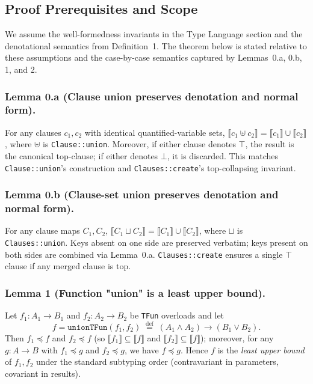 \documentclass[11pt]{article}
\begin{document}
\subsection*{Proof Prerequisites and Scope}
We assume the well-formedness invariants in the Type Language section and the denotational semantics from Definition~1. The theorem below is stated relative to these assumptions and the case-by-case semantics captured by Lemmas~0.a, 0.b, 1, and 2.

\subsubsection*{Lemma 0.a (Clause union preserves denotation and normal form).}
For any clauses $c_1, c_2$ with identical quantified-variable sets, $\llbracket c_1 \mathbin{\uplus} c_2 \rrbracket = \llbracket c_1 \rrbracket \cup \llbracket c_2 \rrbracket$, where $\uplus$ is \texttt{Clause::union}. Moreover, if either clause denotes $\top$, the result is the canonical top-clause; if either denotes $\bot$, it is discarded. This matches \texttt{Clause::union}'s construction and \texttt{Clauses::create}'s top-collapsing invariant.

\subsubsection*{Lemma 0.b (Clause-set union preserves denotation and normal form).}
For any clause maps $C_1, C_2$, $\llbracket C_1 \sqcup C_2 \rrbracket = \llbracket C_1 \rrbracket \cup \llbracket C_2 \rrbracket$, where $\sqcup$ is \texttt{Clauses::union}. Keys absent on one side are preserved verbatim; keys present on both sides are combined via Lemma~0.a. \texttt{Clauses::create} ensures a single $\top$ clause if any merged clause is top.

\subsubsection*{Lemma 1 (Function "union" is a least upper bound).}
Let $f_1 : A_1 \to B_1$ and $f_2 : A_2 \to B_2$ be \texttt{TFun} overloads and let
\[
f = \texttt{unionTFun}(f_1,f_2) \;\stackrel{\mathrm{def}}{=}\; (A_1 \wedge A_2) \to (B_1 \vee B_2).
\]
Then $f_1 \preceq f$ and $f_2 \preceq f$ (so $\llbracket f_1 \rrbracket \subseteq \llbracket f \rrbracket$ and $\llbracket f_2 \rrbracket \subseteq \llbracket f \rrbracket$); moreover, for any $g: A \to B$ with $f_1 \preceq g$ and $f_2 \preceq g$, we have $f \preceq g$. Hence $f$ is the \emph{least upper bound} of $f_1,f_2$ under the standard subtyping order (contravariant in parameters, covariant in results).
\end{document}
